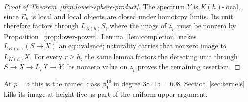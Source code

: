 \begin{proof}[Proof of Theorem~\ref{thm:lower-sphere-product}]
The spectrum $Y$ is $K(h)$-local, since $E_h$ is local and local
objects are closed under homotopy limits. Its unit therefore factors
through $L_{K(h)}S$, where the image of $z_p$ must be nonzero by
Proposition~\ref{prop:lower-power}. Lemma~\ref{lem:completion} makes
$L_{K(h)}(S\to X)$ an equivalence; naturality carries that nonzero
image to $L_{K(h)}X$. For every $r\geq h$, the same lemma factors
the detecting unit through $S\to X\to L_rX\to Y$. Its nonzero value
on $z_p$ proves the remaining assertion.
\end{proof}

At $p=5$ this is the named class $\beta_1^{16}$ in degree
$38\cdot16=608$. Section~\ref{sec:kernels} kills its image at height
five as part of the uniform upper argument.
